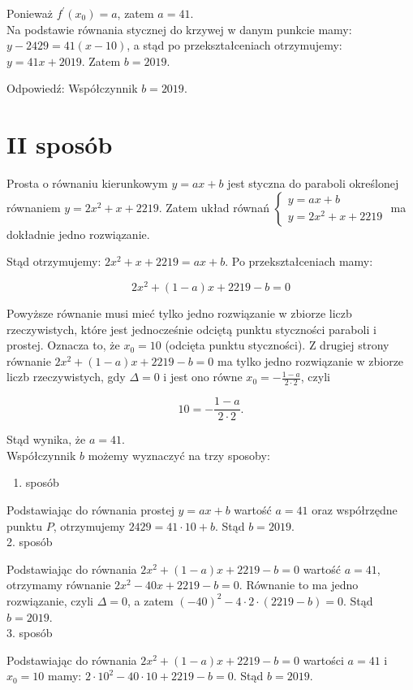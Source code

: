 \documentclass[10pt]{article}
\begin{document}
Ponieważ $f^{\prime}\left(x_{0}\right)=a$, zatem $a=41$.\\
Na podstawie równania stycznej do krzywej w danym punkcie mamy: $y-2429=41(x-10)$, a stąd po przekształceniach otrzymujemy: $y=41 x+2019$. Zatem $b=2019$.

Odpowiedź: Współczynnik $b=2019$.

\section*{II sposób}
Prosta o równaniu kierunkowym $y=a x+b$ jest styczna do paraboli określonej równaniem $y=2 x^{2}+x+2219$. Zatem układ równań $\left\{\begin{array}{l}y=a x+b \\ y=2 x^{2}+x+2219\end{array}\right.$ ma dokładnie jedno rozwiązanie.

Stąd otrzymujemy: $2 x^{2}+x+2219=a x+b$. Po przekształceniach mamy:

$$
2 x^{2}+(1-a) x+2219-b=0
$$

Powyższe równanie musi mieć tylko jedno rozwiązanie w zbiorze liczb rzeczywistych, które jest jednocześnie odciętą punktu styczności paraboli i prostej. Oznacza to, że $x_{0}=10$ (odcięta punktu styczności). Z drugiej strony równanie $2 x^{2}+(1-a) x+2219-b=0$ ma tylko jedno rozwiązanie w zbiorze liczb rzeczywistych, gdy $\Delta=0$ i jest ono równe $x_{0}=-\frac{1-a}{2 \cdot 2}$, czyli

$$
10=-\frac{1-a}{2 \cdot 2} .
$$

Stąd wynika, że $a=41$.\\
Współczynnik $b$ możemy wyznaczyć na trzy sposoby:

\begin{enumerate}
  \item sposób
\end{enumerate}

Podstawiając do równania prostej $y=a x+b$ wartość $a=41$ oraz współrzędne punktu $P$, otrzymujemy $2429=41 \cdot 10+b$. Stąd $b=2019$.\\
2. sposób

Podstawiając do równania $2 x^{2}+(1-a) x+2219-b=0$ wartość $a=41$, otrzymamy równanie $2 x^{2}-40 x+2219-b=0$. Równanie to ma jedno rozwiązanie, czyli $\Delta=0$, a zatem $(-40)^{2}-4 \cdot 2 \cdot(2219-b)=0$. Stąd $b=2019$.\\
3. sposób

Podstawiając do równania $2 x^{2}+(1-a) x+2219-b=0$ wartości $a=41$ i $x_{0}=10$ mamy: $2 \cdot 10^{2}-40 \cdot 10+2219-b=0$. Stąd $b=2019$.
\end{document}
